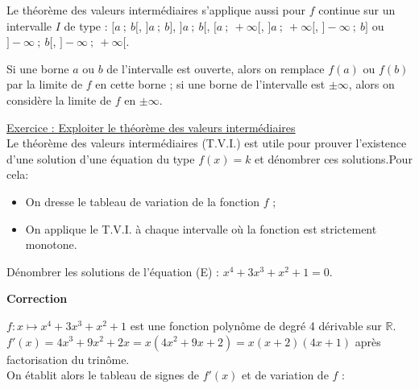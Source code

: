 \documentclass{cornouaille}
\begin{document}
\begin{remarque}
  Le théorème des valeurs intermédiaires s'applique aussi pour $f$
  continue sur un intervalle $I$ de type : $[a~;~b[$, $]a~;~b]$,
  $]a~;~b[$, $[a~;~+\infty[$, $]a~;~+\infty[$,
  $]-\infty~;~b]$ ou $]-\infty~;~b[$, $]-\infty\ ;\ +\infty[$.

  Si une borne $a$ ou $b$ de l'intervalle est ouverte, alors on
  remplace $f(a)$ ou $f(b)$ par la limite de $f$ en cette borne ; si
  une borne de l'intervalle est $\pm\infty$, alors on considère la
  limite de $f$ en $\pm\infty$.
\end{remarque}


\underline{Exercice : Exploiter le théorème des valeurs intermédiaires}\\


Le théorème des valeurs intermédiaires (T.V.I.) est utile pour prouver l'existence d'une \mbox{solution} d'une équation du type $f(x)=k$ et dénombrer ces solutions.Pour cela:
\begin{itemize}
\item On dresse le tableau de variation de la fonction $f$ ;
\item On applique le T.V.I. à chaque intervalle où la fonction est strictement monotone.
\end{itemize}

  

Dénombrer les solutions de l'équation (E) : $x^4+3x^3+x^2+1=0$.

  

\textbf{Correction}


$f:x\mapsto x^4+3x^3+x^2+1$ est une fonction polynôme de degré 4 dérivable sur $\mathbb{R}$.\\
$f'(x)=4x^3+9x^2+2x=x(4x^2+9x+2)=x(x+2)(4x+1)$ après factorisation du trinôme.\\
On établit alors le tableau de signes de $f'(x)$ et de variation de $f$ :
\begin{center}\newcommand{\valeur}{$\simeq1,02$}
 \end{center}
\end{document}
